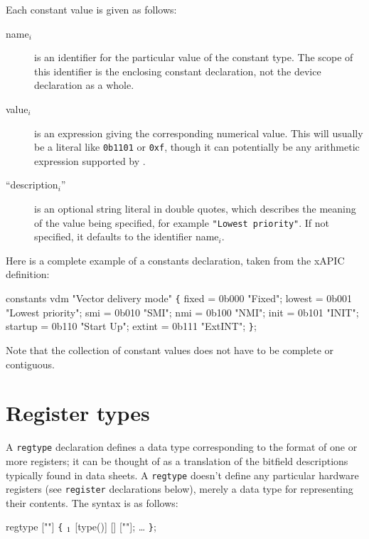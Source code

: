 \documentclass[a4paper,11pt,twoside]{report}
\begin{document}
Each constant value is given as follows:

\begin{description}

\item[name$_i$] is an identifier for the particular value of the
  constant type.  The scope of this identifier is the enclosing
  constant declaration, not the device declaration as a whole.

\item[value$_i$] is an expression giving the corresponding numerical
  value.  This will usually be a literal like \texttt{0b1101} or
  \texttt{0xf}, though it can potentially be any arithmetic expression
  supported by \Mac. 

\item[``description$_i$''] is an optional string literal in double
  quotes, which describes the meaning of the value being specified,
  for example \texttt{"Lowest priority"}.  If not specified, it
  defaults to the identifier name$_i$. 

\end{description}

Here is a complete example of a constants declaration, taken from the
xAPIC definition: 

\begin{example}
constants vdm "Vector delivery mode" \verb+{+
       fixed   = 0b000 "Fixed";
       lowest  = 0b001 "Lowest priority";
       smi     = 0b010 "SMI";
       nmi     = 0b100 "NMI";
       init    = 0b101 "INIT";
       startup = 0b110 "Start Up";
       extint  = 0b111 "ExtINT";
\verb+}+;
\end{example}

Note that the collection of constant values does not have to be
complete or contiguous. 

\section{Register types}\label{sec:regtypes}

A \texttt{regtype} declaration defines a data type corresponding to the
format of one or more registers; it can be thought of as a translation
of the bitfield descriptions typically found in data sheets.   A
\texttt{regtype} doesn't define any particular hardware registers
(see \texttt{register} declarations below), merely a data type for
representing their contents. 
The syntax is as follows:

\begin{syntax}
regtype  [""] \verb+{+
   \(\sb{1}\)  [type()] [] [""];
   \ldots
\verb+}+;
\end{syntax}
\end{document}
